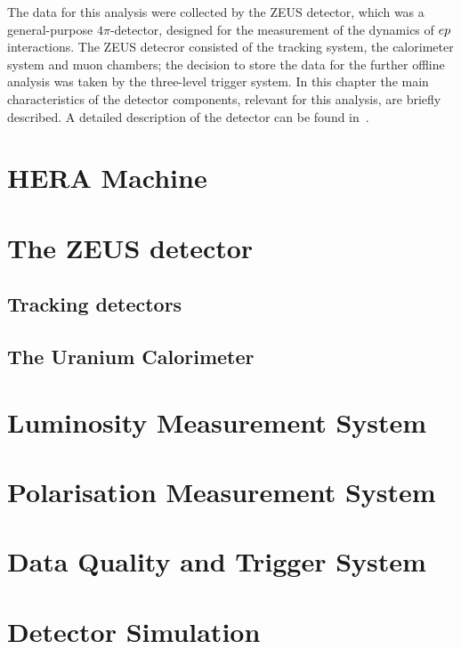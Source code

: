 The data for this analysis were collected by the ZEUS detector, which was a general-purpose $4\pi$-detector, designed for the measurement of the dynamics of $\mbox{$e p$}$ interactions. The ZEUS detecror consisted of the tracking system, the calorimeter system and muon chambers; the decision to store the data for the further offline analysis was taken by the three-level trigger system. In this chapter the main characteristics of the detector components, relevant for this analysis, are briefly described. A detailed description of the detector can be found in~\cite{zeus:1993:bluebook}.

\section{HERA Machine}
\label{sec:hera}


\section{The ZEUS detector}
\label{subsec:zeusdet}


\subsection{Tracking detectors}
\label{subsec:trackdet}


\subsection{The Uranium Calorimeter}
\label{subsec:UCAL}


\section{Luminosity Measurement System}
\label{sec:lumimeas}


\section{Polarisation Measurement System}
\label{sec:polarmeas}


\section{Data Quality and Trigger System}
\label{sec:daqtrigger}


\section{Detector Simulation}
\label{sec:detsim}

